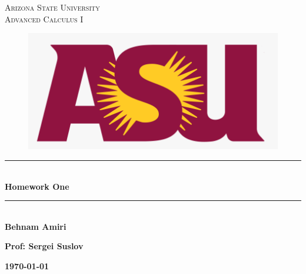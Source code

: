 \documentclass[fleqn]{article}
\begin{document}
  \begin{titlepage}

    \newcommand{\HRule}{\rule{\linewidth}{0.5mm}}

    \center


    \textsc{\LARGE Arizona State University}\\[1.5cm]

    \textsc{\LARGE Advanced Calculus I }\\[1.5cm]


    \begin{figure}
      \includegraphics[width=\linewidth]{asu.png}
    \end{figure}


    \HRule \\[0.4cm]
    { \huge \bfseries Homework One }\\[0.4cm] 
    \HRule \\[1.5cm]

    \textbf{Behnam Amiri}

    \bigbreak

    \textbf{Prof: Sergei Suslov}

    \bigbreak


    \textbf{{\large \today}\\[2cm]}

    \vfill

  \end{titlepage}
\end{document}
